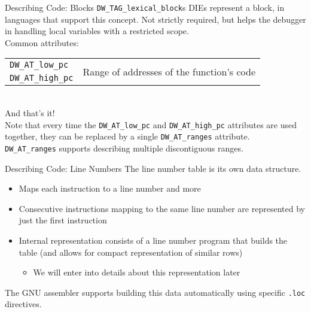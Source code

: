 \begin{frame}{Describing Code: Blocks}
\texttt{DW\_TAG\_lexical\_block}s DIEs represent a block, in languages that support
this concept. Not strictly required, but helps the debugger in handling local variables
with a restricted scope.\\
\medskip
Common attributes:\\
\medskip
\begin{tabular}{ l l }
\texttt{DW\_AT\_low\_pc} & \multirow{2}{*}{Range of addresses of the function's code} \\
\texttt{DW\_AT\_high\_pc} &  \\
\end{tabular}\\
\smallskip
And that's it!\\
\bigskip
Note that every time the \texttt{DW\_AT\_low\_pc} and \texttt{DW\_AT\_high\_pc} attributes
are used together, they can be replaced by a single \texttt{DW\_AT\_ranges} attribute.\\
\smallskip
\texttt{DW\_AT\_ranges} supports describing multiple discontiguous ranges.
\end{frame}


\begin{frame}{Describing Code: Line Numbers}
The \alert{line number table} is its own data structure.\\
\begin{itemize}
\item Maps each instruction to a line number and more
\item Consecutive instructions mapping to the same line number are
	represented by just the first instruction
\item Internal representation consists of a \alert{line number program} 
	that builds the table (and allows for compact representation of
	similar rows)
	\begin{itemize}
	\item We will enter into details about this representation later
	\end{itemize}
\end{itemize}
\medskip
The GNU assembler supports building this data automatically using specific 
\texttt{.loc} directives.
\end{frame}


